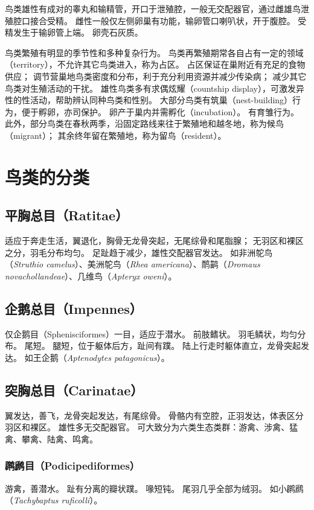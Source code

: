\documentclass[11pt]{article}
\begin{document}
\newline

鸟类雄性有成对的睾丸和输精管，开口于泄殖腔，一般无交配器官，通过雌雄鸟泄殖腔口接合受精。
雌性一般仅左侧卵巢有功能，输卵管口喇叭状，开于腹腔。
受精发生于输卵管上端。
卵壳石灰质。

\newline

鸟类繁殖有明显的季节性和多种复杂行为。
鸟类再繁殖期常各自占有一定的领域（territory），不允许其它鸟类进入，称为占区。
占区保证在巢附近有充足的食物供应；
调节营巢地鸟类密度和分布，利于充分利用资源并减少传染病；
减少其它鸟类对生殖活动的干扰。
雄性鸟类多有求偶炫耀（countship display），可激发异性的性活动，帮助辨认同种鸟类和性别。
大部分鸟类有筑巢（nest-building）行为，便于孵卵，亦司保护。
卵产于巢内并需孵化（incubation）。
有育雏行为。
此外，部分鸟类在春秋两季，沿固定路线来往于繁殖地和越冬地，称为候鸟（migrant）；
其余终年留在繁殖地，称为留鸟（resident）。

\section{鸟类的分类}
\subsection{平胸总目（Ratitae）}
适应于奔走生活，翼退化，胸骨无龙骨突起，无尾综骨和尾脂腺；
无羽区和裸区之分，羽毛分布均匀。
足趾趋于减少，雄性交配器官发达。
如非洲鸵鸟（\textit{Struthio camelus}）、美洲鸵鸟（\textit{Rhea americana}）、鸸鹋（\textit{Dromaus novachollandeae}）、几维鸟（\textit{Apteryx oweni}）。

\subsection{企鹅总目（Impennes）}
仅企鹅目（Sphenisciformes）一目，适应于潜水。
前肢鳍状。
羽毛鳞状，均匀分布。
尾短。
腿短，位于躯体后方，趾间有蹼。
陆上行走时躯体直立，龙骨突起发达。
如王企鹅（\textit{Aptenodytes patagonicus}）。

\subsection{突胸总目（Carinatae）}
翼发达，善飞，龙骨突起发达，有尾综骨。
骨骼内有空腔，正羽发达，体表区分羽区和裸区。
雄性多无交配器官。
可大致分为六类生态类群：游禽、涉禽、猛禽、攀禽、陆禽、鸣禽。

\subsubsection{䴙䴘目（Podicipediformes）}
游禽，善潜水。
趾有分离的瓣状蹼。
喙短钝。
尾羽几乎全部为绒羽。
如小䴙䴘（\textit{Tachybaptus ruficolli}）。
\end{document}
